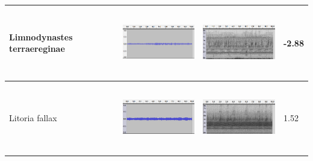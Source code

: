 \begin{table}[htb!]
{\begin{tabular}{llll}
Limnodynastes terraereginae &  \begin{minipage}{.3\textwidth} \includegraphics[width=45mm, height=30mm]{image/ter_jcu_wav.png}  \end{minipage}        &   \begin{minipage}{.3\textwidth} \includegraphics[width=45mm, height=30mm]{image/ter_jcu_spec.png}  \end{minipage}          & -2.88    \\ \hline
Litoria fallax              &   \begin{minipage}{.3\textwidth} \includegraphics[width=45mm, height=30mm]{image/fallax_jcu_wav.png}  \end{minipage}       &    \begin{minipage}{.3\textwidth} \includegraphics[width=45mm, height=30mm]{image/fallax_jcu_spec.png}  \end{minipage}         & 1.52     \\ \hline

\end{tabular}}
\end{table}
